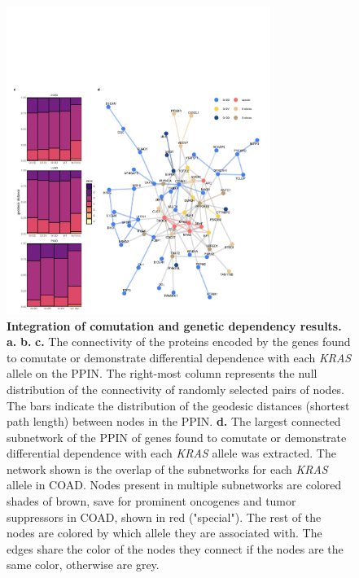 \documentclass[english, 10pt, letterpaper]{article}
\newcommand{\beginsupplement}{%
        \setcounter{table}{0}
        \renewcommand{\thetable}{\arabic{table}}%
        \setcounter{figure}{0}
        \renewcommand{\thefigure}{\arabic{figure}}%
     }
\newcommand{\KRAS}{\emph{KRAS}}
\begin{document}
\begin{figure}
\centering
\includegraphics[height=100mm]{figures/Figure_05.jpeg}
\caption{
    \textbf{Integration of comutation and genetic dependency results.}
    \textbf{a.}
    \textbf{b.} 
    \textbf{c.} The connectivity of the proteins encoded by the genes found to comutate or demonstrate differential dependence with each \KRAS{} allele on the PPIN. The right-most column represents the null distribution of the connectivity of randomly selected pairs of nodes. The bars indicate the distribution of the geodesic distances (shortest path length) between nodes in the PPIN.
    \textbf{d.} The largest connected subnetwork of the PPIN of genes found to comutate or demonstrate differential dependence with each \KRAS{} allele was extracted. The network shown is the overlap of the subnetworks for each \KRAS{} allele in COAD. Nodes present in multiple subnetworks are colored shades of brown, save for prominent oncogenes and tumor suppressors in COAD, shown in red ("special"). The rest of the nodes are colored by which allele they are associated with. The edges share the color of the nodes they connect if the nodes are the same color, otherwise are grey.
}
\label{fig:results_integration_main}
\end{figure}



\beginsupplement
\end{document}
